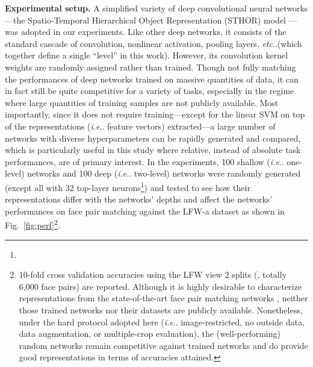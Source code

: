 \documentclass[fleqn]{article} %
\makeatletter
\DeclareRobustCommand\onedot{\futurelet\@let@token\@onedot}
\def\@onedot{\ifx\@let@token.\else.\null\fi\xspace}
\def\eg{\emph{e.g}\onedot} \def\Eg{\emph{E.g}\onedot}
\def\ie{\emph{i.e}\onedot} \def\Ie{\emph{I.e}\onedot}
\def\etc{\emph{etc}\onedot} \def\vs{\emph{vs}\onedot}
\makeatother
\begin{document}
\newcommand{\expperf}{10-fold cross validation accuracies using the LFW view 2 splits (\cite{LFWTech}, totally 6,000 face pairs) are reported.
Although it is highly desirable to characterize representations from the state-of-the-art face pair matching networks \cite{taigman2014deepface, sun2014deep, schroff2015facenet}, neither those trained networks nor their datasets are publicly available.
Nonetheless, under the hard protocol adopted here (\ie image-restricted, no outside data, data augmentation, or multiple-crop evaluation), the (well-performing) random networks remain competitive against trained networks and do provide good representations in terms of accuracies attained.
} 

{\bf Experimental setup.}
A simplified variety of deep convolutional neural networks \cite{krizhevsky2012imagenet, sermanet2013overfeat, szegedy2014going}---the Spatio-Temporal Hierarchical Object Representation (STHOR) model \cite{cox2011beyond, sthor}---{was} adopted in our experiments.
Like other deep networks, it consists of the standard cascade of convolution, nonlinear activation, pooling layers, \etc (which together define a single ``level'' in this work).
However, its convolution kernel weights are randomly assigned rather than trained.
Though not fully matching the performances of deep networks trained on massive quantities of data, it can in fact still be quite competitive for a variety of tasks, especially in the regime where large quantities of training samples are not publicly available. %
Most importantly, since it does not require training---except for the linear SVM on top of the representations (\ie feature vectors) extracted---a large number of networks with diverse hyperparameters can be rapidly generated and compared, which is particularly useful in this study where relative, instead of absolute task performances, are of primary interest.
In the experiments, 100 shallow (\ie one-level) networks and 100 deep (\ie two-level) networks {were} randomly generated (except all with 32 top-layer neurons\footnote{\expsettings}) and tested to see how their representations differ with the networks' depths and affect the networks' performances on face pair matching against the LFW-a dataset \cite{wolf2011effective} as shown in Fig.~\ref{fig:perf}\footnote{\expperf}.
\end{document}

